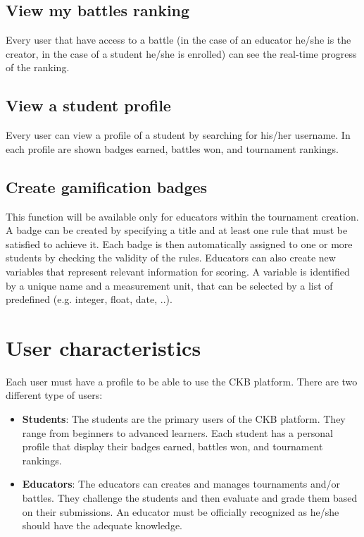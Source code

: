 \subsection{View my battles ranking}
Every user that have access to a battle (in the case of an educator he/she is the creator, in the case of a student he/she is enrolled) can see the real-time progress of the ranking. 

\subsection{View a student profile}
Every user can view a profile of a student by searching for his/her username. In each profile are shown badges earned, battles won, and tournament rankings. 

\subsection{Create gamification badges}
This function will be available only for educators within the tournament creation. 
\newline A badge can be created by specifying a title and at least one rule that must be satisfied to achieve it. Each badge is then automatically assigned to one or more students by checking the validity of the rules. Educators can also create new variables that represent relevant information for scoring. A variable is identified by a unique name and a measurement unit, that can be selected by a list of predefined (e.g. integer, float, date, ..).

\clearpage

\section{User characteristics}
Each user must have a profile to be able to use the CKB platform.
There are two different type of users:
\begin{itemize}
	\item \textbf{Students}:
	    The students are the primary users of the CKB platform. They range from beginners to advanced learners. Each student has a personal profile that display their badges earned, battles won, and tournament rankings. 
	\item \textbf{Educators}: 
		The educators can creates and manages tournaments and/or battles. They challenge the students and then evaluate and grade them based on their submissions. An educator must be officially recognized as he/she should have the adequate knowledge.
\end{itemize}

